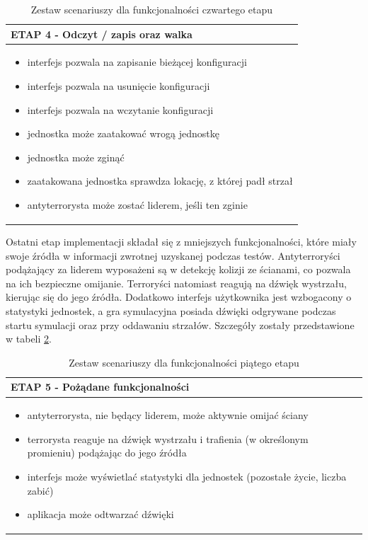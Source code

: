 \begin{table}
\begin{center}
\begin{tabular}{|p{}|}
\hline
ETAP 4 - Odczyt / zapis oraz walka\\\hline
	\begin{itemize}
		\setlength\itemsep{0pt}
		\item interfejs pozwala na zapisanie bieżącej konfiguracji
		\item interfejs pozwala na usunięcie konfiguracji
		\item interfejs pozwala na wczytanie konfiguracji
		\item jednostka może zaatakować wrogą jednostkę
		\item jednostka może zginąć
		\item zaatakowana jednostka sprawdza lokację, z której padł strzał
		\item antyterrorysta może zostać liderem, jeśli ten zginie
	\end{itemize}
\\\hline
\end{tabular}
\caption {Zestaw scenariuszy dla funkcjonalności czwartego etapu\label{scenarios4}}
\end{center}
\end{table} 

Ostatni etap implementacji składał się z mniejszych funkcjonalności, które miały swoje źródła w informacji zwrotnej uzyskanej podczas testów. Antyterroryści podążający za liderem wyposażeni są w detekcję kolizji ze ścianami, co pozwala na ich bezpieczne omijanie. Terroryści natomiast reagują na dźwięk wystrzału, kierując się do jego źródła. Dodatkowo interfejs użytkownika jest wzbogacony o statystyki jednostek, a gra symulacyjna posiada dźwięki odgrywane podczas startu symulacji oraz przy oddawaniu strzałów. Szczegóły zostały przedstawione w tabeli \ref{scenarios5}.

\begin{table}
\begin{center}
\begin{tabular}{|p{}|}
\hline
ETAP 5 - Pożądane funkcjonalności\\\hline
	\begin{itemize}
		\setlength\itemsep{0pt}
		\item antyterrorysta, nie będący liderem, może aktywnie omijać ściany
		\item terrorysta reaguje na dźwięk wystrzału i trafienia (w określonym promieniu) podążając do jego źródła
		\item interfejs może wyświetlać statystyki dla jednostek (pozostałe życie, liczba zabić)
		\item aplikacja może odtwarzać dźwięki
	\end{itemize}
\\\hline
\end{tabular}
\caption {Zestaw scenariuszy dla funkcjonalności piątego etapu\label{scenarios5}}
\end{center}
\end{table} 

